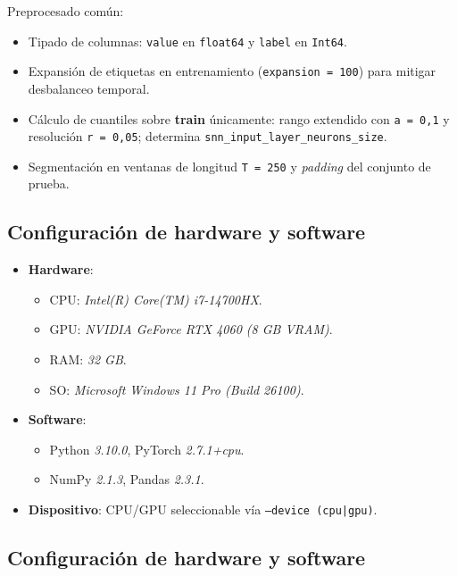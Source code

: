 Preprocesado común:
\begin{itemize}
    \item Tipado de columnas: \texttt{value} en \texttt{float64} y \texttt{label} en \texttt{Int64}.
    \item Expansión de etiquetas en entrenamiento (\texttt{expansion = 100}) para mitigar desbalanceo temporal.
    \item Cálculo de cuantiles sobre \textbf{train} únicamente: rango extendido con \texttt{a = 0{,}1} y resolución \texttt{r = 0{,}05}; determina \texttt{snn\_input\_layer\_neurons\_size}.
    \item Segmentación en ventanas de longitud \texttt{T = 250} y \textit{padding} del conjunto de prueba.
\end{itemize}

\subsection{Configuración de hardware y software}
\begin{itemize}
    \item \textbf{Hardware}:
    \begin{itemize}
        \item CPU: \textit{Intel(R) Core(TM) i7-14700HX}.
        \item GPU: \textit{NVIDIA GeForce RTX 4060 (8 GB VRAM)}.
        \item RAM: \textit{32 GB}.
        \item SO: \textit{Microsoft Windows 11 Pro (Build 26100)}.
    \end{itemize}
    \item \textbf{Software}:
    \begin{itemize}
        \item Python \textit{3.10.0}, PyTorch \textit{2.7.1+cpu}.
        \item NumPy \textit{2.1.3}, Pandas \textit{2.3.1}.
    \end{itemize}
    \item \textbf{Dispositivo}: CPU/GPU seleccionable vía \texttt{--device (cpu|gpu)}.

\end{itemize}

\subsection{Configuración de hardware y software}
\label{subsec:config_hw_sw}


